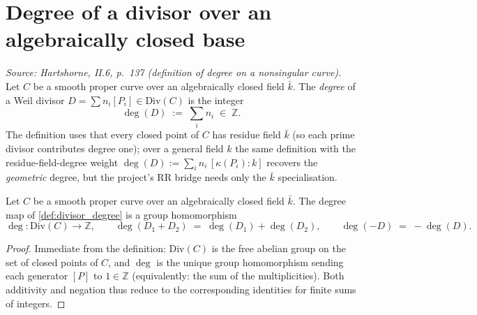 \section{Degree of a divisor over an algebraically closed base}
\begin{definition}
  \label{def:divisor_degree}
  
  \textit{Source: Hartshorne, II.6, p.~137 (definition of degree on a
  nonsingular curve).}
  Let \(C\) be a smooth proper curve over an algebraically closed field
  \(\bar k\). The \emph{degree} of a Weil divisor $D = \sum n_i [P_i] \in
  \mathrm{Div}(C)$ is the integer
  \[
    \deg(D) \;:=\; \sum_i n_i \;\in\; \mathbb Z.
  \]
  The definition uses that every closed point of \(C\) has residue field
  \(\bar k\) (so each prime divisor contributes degree one); over a general
  field \(k\) the same definition with the residue-field-degree weight
  \(\deg(D) := \sum_i n_i \, [\kappa(P_i) : k]\) recovers the
  \emph{geometric} degree, but the project's RR bridge needs only the
  \(\bar k\) specialisation.
\end{definition}
\begin{theorem}
  \label{thm:divisor_degree_hom}
  Let \(C\) be a smooth proper curve over an algebraically closed field
  \(\bar k\). The degree map of \ref{def:divisor_degree} is a group
  homomorphism
  \[
    \deg \colon \mathrm{Div}(C) \longrightarrow \mathbb Z,
    \qquad
    \deg(D_1 + D_2) \;=\; \deg(D_1) + \deg(D_2),
    \qquad
    \deg(-D) \;=\; -\deg(D).
  \]
\end{theorem}
\begin{proof}
  Immediate from the definition: \(\mathrm{Div}(C)\) is the free abelian group on the
  set of closed points of \(C\), and \(\deg\) is the unique group homomorphism
  sending each generator \([P]\) to \(1 \in \mathbb Z\) (equivalently: the sum
  of the multiplicities). Both additivity and negation thus reduce to the
  corresponding identities for finite sums of integers.
\end{proof}
